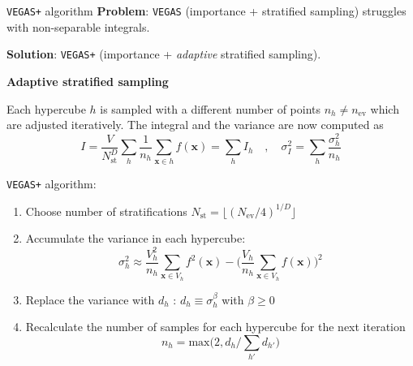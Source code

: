 \documentclass[t,handout,professionalfont,serif]{beamer}
\begin{document}
\begin{frame}{\texttt{VEGAS+} algorithm}
	\scriptsize
	\textbf{Problem}: \texttt{VEGAS} (importance + stratified sampling) struggles with non-separable integrals. 
	
	\textbf{Solution}: \texttt{VEGAS+} (importance + \emph{adaptive} stratified sampling).
	
	\vspace{0.3cm}
	
	\textbf{Adaptive stratified sampling}
	
	Each hypercube $h$ is sampled with a different number of points $n_h \neq n_\text{ev}$ which are adjusted iteratively. The integral and the variance are now computed as
	$$ I = \frac{V}{N_\text{st}^D}\sum_h \frac{1}{n_h} \sum_{\textbf{x} \in h} f(\textbf{x})  = \sum_h I_h  \quad , \quad \sigma^2_I = \sum_h  \frac{\sigma^2_h}{n_h} $$
	
	\texttt{VEGAS+} algorithm:
	\begin{enumerate}
		\item Choose number of stratifications $N_\text{st} = \lfloor (N_\text{ev}/4)^{1/D}\rfloor $
		\item Accumulate the variance in each hypercube:
		$$ \sigma^2_h \approx \frac{V_h^2}{n_h} \sum_{\textbf{x} \in V_h} f^2(\textbf{x}) - \bigg( \frac{V_h}{n_h} \sum_{\textbf{x} \in V_h} f(\textbf{x})\bigg)^2  $$
		\item Replace the variance with $d_h$ : $d_h \equiv \sigma_h^\beta$ with $\beta \geq 0$
		\item Recalculate the number of samples for each hypercube for the next iteration
		$$ n_h = \text{max} \big(2, d_h / \sum_{h'} d_{h'}\big)  $$
	\end{enumerate}
	
\end{frame}
\end{document}
